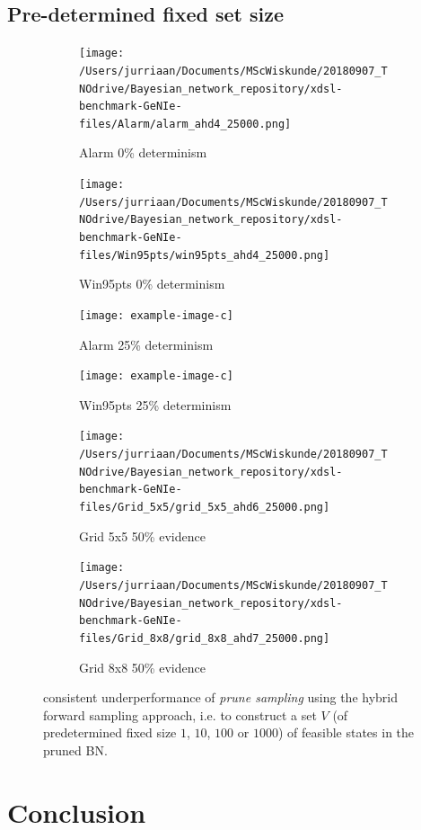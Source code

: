 \documentclass[a4paper, twoside, 11pt]{report}
\theoremstyle{plain}
\theoremstyle{definition}
\theoremstyle{remark}
\newcommand{\ps}{\textit{prune sampling }}
\begin{document}
\section{Pre-determined fixed set size}
\begin{figure}[h!]
\centering

\begin{subfigure}{.5\linewidth}
\texttt{[image: /Users/jurriaan/Documents/MScWiskunde/20180907\_TNOdrive/Bayesian\_network\_repository/xdsl-benchmark-GeNIe-files/Alarm/alarm\_ahd4\_25000.png]}
\caption{Alarm 0\% determinism}%
\label{alarm_ev}%
\end{subfigure}\hfill%
\begin{subfigure}{.5\linewidth}
\texttt{[image: /Users/jurriaan/Documents/MScWiskunde/20180907\_TNOdrive/Bayesian\_network\_repository/xdsl-benchmark-GeNIe-files/Win95pts/win95pts\_ahd4\_25000.png]}
\caption{Win95pts 0\% determinism}%
\label{win95pts_ev}%
\end{subfigure}

\begin{subfigure}{.5\linewidth}
\texttt{[image: example-image-c]}
\caption{Alarm 25\% determinism}%
\label{grid_3x3}%
\end{subfigure}\hfill%
\begin{subfigure}{.5\linewidth}
\texttt{[image: example-image-c]}
\caption{Win95pts 25\% determinism}%
\label{grid_5x5}%
\end{subfigure}

\begin{subfigure}{.5\linewidth}
\texttt{[image: /Users/jurriaan/Documents/MScWiskunde/20180907\_TNOdrive/Bayesian\_network\_repository/xdsl-benchmark-GeNIe-files/Grid\_5x5/grid\_5x5\_ahd6\_25000.png]}
\caption{Grid 5x5 50\% evidence}%
\label{grid_3x3}%
\end{subfigure}\hfill%
\begin{subfigure}{.5\linewidth}
\texttt{[image: /Users/jurriaan/Documents/MScWiskunde/20180907\_TNOdrive/Bayesian\_network\_repository/xdsl-benchmark-GeNIe-files/Grid\_8x8/grid\_8x8\_ahd7\_25000.png]}
\caption{Grid 8x8 50\% evidence}%
\label{grid_5x5}%
\end{subfigure}

\vspace{0.75pc}
\caption{consistent underperformance of \ps using the hybrid forward sampling approach, i.e. to construct a set $V$ (of predetermined fixed size $1$, $10$, $100$ or $1000$) of feasible states in the pruned BN. }
\label{results1}
\end{figure}

\chapter{Conclusion}
\citep{lauritzen1988local}




\end{document}
